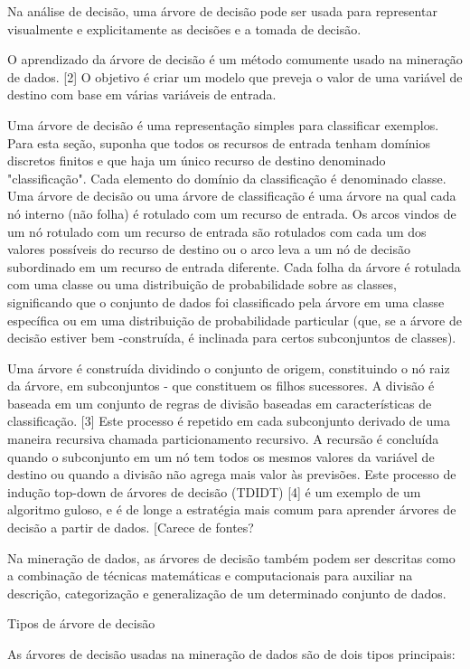 \documentclass{article}
\begin{document}
Na análise de decisão, uma árvore de decisão pode ser usada para representar visualmente e explicitamente as decisões e a tomada de decisão.


O aprendizado da árvore de decisão é um método comumente usado na mineração de dados. [2] O objetivo é criar um modelo que preveja o valor de uma variável de destino com base em várias variáveis de entrada.

Uma árvore de decisão é uma representação simples para classificar exemplos. Para esta seção, suponha que todos os recursos de entrada tenham domínios discretos finitos e que haja um único recurso de destino denominado "classificação". Cada elemento do domínio da classificação é denominado classe. Uma árvore de decisão ou uma árvore de classificação é uma árvore na qual cada nó interno (não folha) é rotulado com um recurso de entrada. Os arcos vindos de um nó rotulado com um recurso de entrada são rotulados com cada um dos valores possíveis do recurso de destino ou o arco leva a um nó de decisão subordinado em um recurso de entrada diferente. Cada folha da árvore é rotulada com uma classe ou uma distribuição de probabilidade sobre as classes, significando que o conjunto de dados foi classificado pela árvore em uma classe específica ou em uma distribuição de probabilidade particular (que, se a árvore de decisão estiver bem -construída, é inclinada para certos subconjuntos de classes).

Uma árvore é construída dividindo o conjunto de origem, constituindo o nó raiz da árvore, em subconjuntos - que constituem os filhos sucessores. A divisão é baseada em um conjunto de regras de divisão baseadas em características de classificação. [3] Este processo é repetido em cada subconjunto derivado de uma maneira recursiva chamada particionamento recursivo. A recursão é concluída quando o subconjunto em um nó tem todos os mesmos valores da variável de destino ou quando a divisão não agrega mais valor às previsões. Este processo de indução top-down de árvores de decisão (TDIDT) [4] é um exemplo de um algoritmo guloso, e é de longe a estratégia mais comum para aprender árvores de decisão a partir de dados. [Carece de fontes?

Na mineração de dados, as árvores de decisão também podem ser descritas como a combinação de técnicas matemáticas e computacionais para auxiliar na descrição, categorização e generalização de um determinado conjunto de dados.

Tipos de árvore de decisão

As árvores de decisão usadas na mineração de dados são de dois tipos principais:
\end{document}
